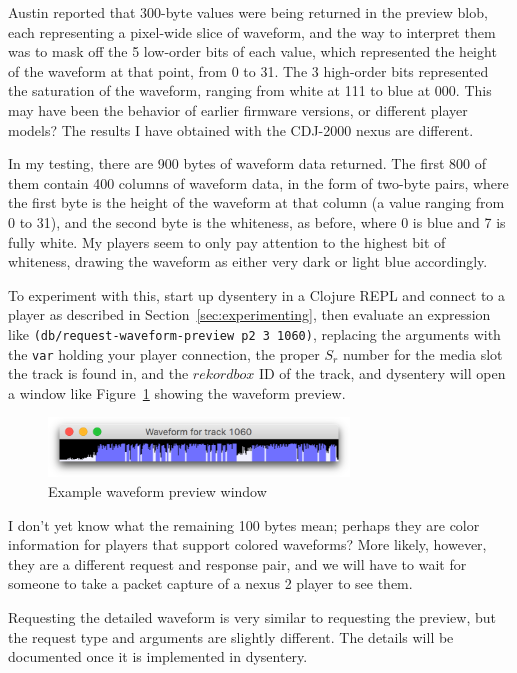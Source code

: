 \documentclass[11pt]{article}
\begin{document}
Austin reported that 300-byte values were being returned in the
preview blob, each representing a pixel-wide slice of waveform, and
the way to interpret them was to mask off the 5 low-order bits of each
value, which represented the height of the waveform at that point,
from 0 to 31. The 3 high-order bits represented the saturation of the
waveform, ranging from white at 111 to blue at 000. This may have been
the behavior of earlier firmware versions, or different player models?
The results I have obtained with the CDJ-2000 nexus are different.

In my testing, there are 900 bytes of waveform data returned. The
first 800 of them contain 400 columns of waveform data, in the form of
two-byte pairs, where the first byte is the height of the waveform at
that column (a value ranging from 0 to 31), and the second byte is the
whiteness, as before, where 0 is blue and 7 is fully white. My players
seem to only pay attention to the highest bit of whiteness, drawing
the waveform as either very dark or light blue accordingly.

To experiment with this, start up dysentery in a Clojure REPL and
connect to a player as described in Section~\ref{sec:experimenting},
then evaluate an expression like {\tt (db/request-waveform-preview p2
  3 1060)}, replacing the arguments with the {\tt var} holding your
player connection, the proper $S_r$ number for the media slot the
track is found in, and the $rekordbox$ ID of the track, and dysentery
will open a window like Figure~{\ref{fig:waveformPreviewExample}}
showing the waveform preview.

\begin{figure}
  \vspace{5mm}
  \centering
  \includegraphics[width=8cm]{assets/Wave-preview-example}
  \caption{Example waveform preview window}
  \label{fig:waveformPreviewExample}
\end{figure}

I don't yet know what the remaining 100 bytes mean; perhaps they are
color information for players that support colored waveforms? More
likely, however, they are a different request and response pair, and
we will have to wait for someone to take a packet capture of a nexus 2
player to see them.

Requesting the detailed waveform is very similar to requesting the
preview, but the request type and arguments are slightly different.
The details will be documented once it is implemented in dysentery.
\end{document}
